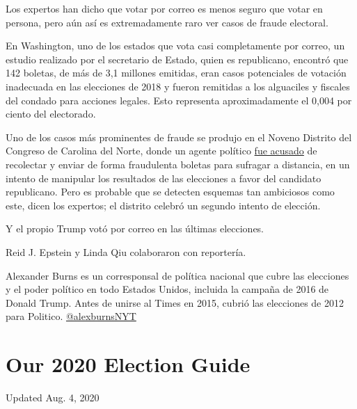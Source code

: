 Los expertos han dicho que votar por correo es menos seguro que votar en
persona, pero aún así es extremadamente raro ver casos de fraude
electoral.

En Washington, uno de los estados que vota casi completamente por
correo, un estudio realizado por el secretario de Estado, quien es
republicano, encontró que 142 boletas, de más de 3,1 millones emitidas,
eran casos potenciales de votación inadecuada en las elecciones de 2018
y fueron remitidas a los alguaciles y fiscales del condado para acciones
legales. Esto representa aproximadamente el 0,004 por ciento del
electorado.

Uno de los casos más prominentes de fraude se produjo en el Noveno
Distrito del Congreso de Carolina del Norte, donde un agente político
\href{https://www.nytimes.com/2019/07/30/us/mccrae-dowless-indictment.html}{fue
acusado} de recolectar y enviar de forma fraudulenta boletas para
sufragar a distancia, en un intento de manipular los resultados de las
elecciones a favor del candidato republicano. Pero es probable que se
detecten esquemas tan ambiciosos como este, dicen los expertos; el
distrito celebró un segundo intento de elección.

Y el propio Trump votó por correo en las últimas elecciones.

Reid J. Epstein y Linda Qiu colaboraron con reportería.

Alexander Burns es un corresponsal de política nacional que cubre las
elecciones y el poder político en todo Estados Unidos, incluida la
campaña de 2016 de Donald Trump. Antes de unirse al Times en 2015,
cubrió las elecciones de 2012 para Politico.
\href{https://twitter.com/alexburnsNYT}{@alexburnsNYT}

\hypertarget{our-2020-election-guide}{%
\section{Our 2020 Election Guide}\label{our-2020-election-guide}}

Updated Aug. 4, 2020


